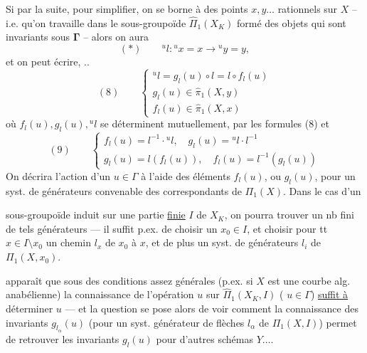 Si  par la suite, pour simplifier, on se borne à des points $x,y\ldots$ rationnels sur $X$ -- i.e. qu'on travaille dans le sous-groupoïde $\widehat\Pi_1(X_K)$ formé des objets qui sont invariants sous $\mathbf{\Gamma}$ -- alors on aura
\[
(*)\qquad{}^u{l}:{}^ux=x\longrightarrow{}^uy=y,
\]
et on peut écrire, ..
\[
(8)\qquad\begin{cases}
{}^u{l}=g_{l}(u)\circ{l}={l}\circ f_{l}(u)\\
g_{l}(u)\in\widehat\pi_1(X,y)\\
f_{l}(u)\in\widehat\pi_1(X,x)
\end{cases}
\]
où $f_{l}(u),g_{l}(u),{}^u{l}$ se déterminent mutuellement,  par les formules (8) et
\[
(9)\qquad\begin{cases}
f_{l}(u)={l}^{-1}\cdot{}^u{l},\quad g_{l}(u)={}^u{l}\cdot{l}^{-1}\\
g_{l}(u)={l}(f_{l}(u)),\quad f_{l}(u)={l}^{-1}(g_{l}(u))
\end{cases}
\]
On décrira l'action d'un $u\in\Gamma$  à l'aide des éléments $f_{l}(u)$, ou $g_{l}(u)$, pour un syst. de générateurs convenable des  correspondants de $\Pi_1(X)$. Dans le cas d'un

sous-groupoïde induit sur une partie \uline{finie}  $I$ de $X_K$, on pourra trouver un nb fini de tels générateurs --- il suffit p.ex. de choisir un  $x_0\in I$, et choisir pour tt $x\in I\setminus x_0$ un chemin $l_x$ de $x_0$ à $x$, et de plus un syst.  de générateurs $l_i$ de $\Pi_1(X,x_0)$.

 apparaît que sous des conditions assez générales (p.ex. si $X$ est une courbe alg. anabélienne) la connaissance de l'opération $u$ sur $\widehat{\Pi}_1(X_K,I)$ ( $u\in\Gamma$) \uline{suffit à} déterminer $u$ --- et la question se pose alors de voir comment la connaissance des invariants  $g_{l_\alpha}(u)$ (pour un syst. générateur de flèches $l_\alpha$ de $\Pi_1(X,I)$) permet de retrouver les invariants $g_l(u)$ pour d'autres schémas $Y\ldots$.

